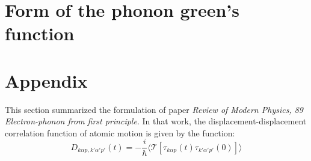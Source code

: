 \documentclass{article}
\begin{document}
\section{Form of the phonon green's function} 

\newpage
\section*{Appendix}
This section summarized the formulation of paper \emph{Review of Modern Physics, 89 Electron-phonon from first principle}.
In that work, the displacement-displacement correlation function of atomic motion is given 
by the function:
\begin{equation}
    D_{k\alpha p, k'\alpha'p'}(t) = -\frac{i}{\hbar} \langle \mathcal{T} [\tau_{k\alpha p}(t) \tau_{k'\alpha'p'}(0)] \rangle 
\end{equation}
\end{document}
